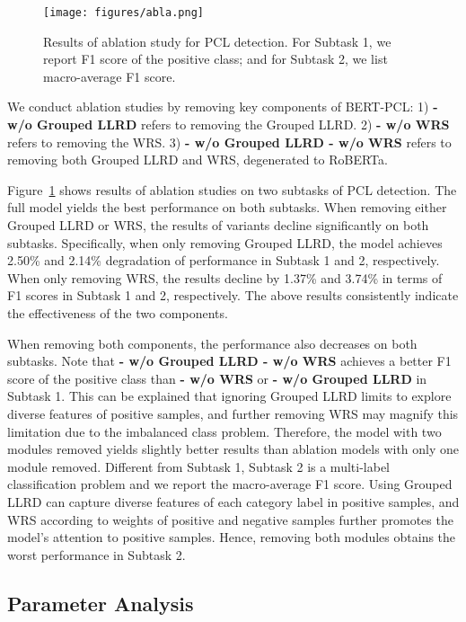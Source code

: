 \documentclass[11pt]{article}
\begin{document}
\begin{figure}[t]
    \centering
    \texttt{[image: figures/abla.png]}
    \caption{Results of ablation study for PCL detection.
    For Subtask 1, we report F1 score of the positive class; and for Subtask 2, we list macro-average F1 score.
    }
    \label{fig:result_abla}
\end{figure}

We conduct ablation studies by removing key components of BERT-PCL:  
1) \textbf{- w/o Grouped LLRD} refers to removing the Grouped LLRD.
2) \textbf{- w/o WRS} refers to removing the WRS.
3) \textbf{- w/o Grouped LLRD - w/o WRS} refers to removing both Grouped LLRD and WRS, degenerated to RoBERTa.



Figure~\ref{fig:result_abla} shows results of ablation studies on two subtasks of PCL detection.
The full model yields the best performance on both subtasks. 
When removing either Grouped LLRD or WRS, the results of variants decline significantly on both subtasks. 
Specifically, when only removing Grouped LLRD, the model achieves 2.50\%  and 2.14\% degradation of performance in Subtask 1 and 2, respectively.
When only removing WRS, the results decline by 1.37\% and 3.74\% in terms of F1 scores in Subtask 1 and 2, respectively.
The above results consistently indicate the effectiveness of the two components.

When removing both components, the performance also decreases on both subtasks.
Note that \textbf{- w/o Grouped LLRD - w/o WRS} achieves a better F1 score of the positive class than \textbf{- w/o WRS} or \textbf{- w/o Grouped LLRD} in Subtask 1.
This can be explained that ignoring Grouped LLRD limits to explore diverse features of positive samples, and further removing WRS may magnify this limitation due to the imbalanced class problem.
Therefore, the model with two modules removed yields slightly better results than ablation models with only one module removed.
Different from Subtask 1, Subtask 2 is a multi-label classification problem and we report the macro-average F1 score.
Using Grouped LLRD can capture diverse features of each category label in positive samples, and WRS according to weights of positive and negative samples further promotes the model's attention to positive samples.
Hence, removing both modules obtains the worst performance in Subtask 2.



\subsection{Parameter Analysis}
\end{document}
